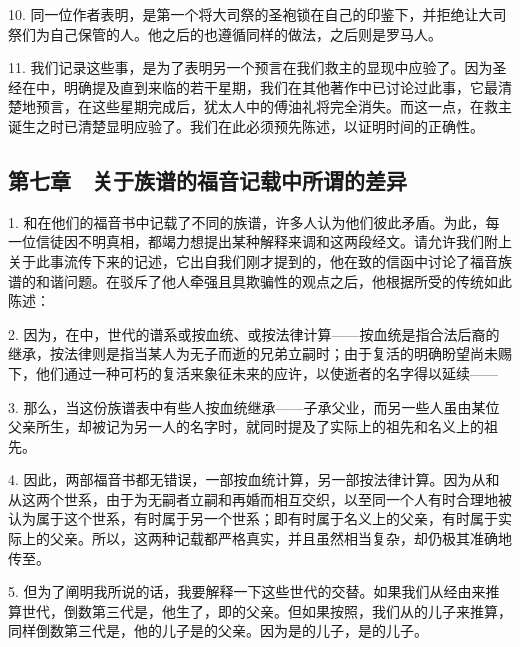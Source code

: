 10. 同一位作者表明，是第一个将大司祭的圣袍锁在自己的印鉴下，并拒绝让大司祭们为自己保管的人。他之后的也遵循同样的做法，之后则是罗马人。\par

11. 我们记录这些事，是为了表明另一个预言在我们救主的显现中应验了。因为圣经在中，明确提及直到来临的若干星期，我们在其他著作中已讨论过此事，它最清楚地预言，在这些星期完成后，犹太人中的傅油礼将完全消失。而这一点，在救主诞生之时已清楚显明应验了。我们在此必须预先陈述，以证明时间的正确性。\par


\subsection{第七章　关于族谱的福音记载中所谓的差异}

1. 和在他们的福音书中记载了不同的族谱，许多人认为他们彼此矛盾。为此，每一位信徒因不明真相，都竭力想提出某种解释来调和这两段经文。请允许我们附上关于此事流传下来的记述，它出自我们刚才提到的，他在致的信函中讨论了福音族谱的和谐问题。在驳斥了他人牵强且具欺骗性的观点之后，他根据所受的传统如此陈述：\par

2. 因为，在中，世代的谱系或按血统、或按法律计算——按血统是指合法后裔的继承，按法律则是指当某人为无子而逝的兄弟立嗣时；由于复活的明确盼望尚未赐下，他们通过一种可朽的复活来象征未来的应许，以使逝者的名字得以延续——\par

3. 那么，当这份族谱表中有些人按血统继承——子承父业，而另一些人虽由某位父亲所生，却被记为另一人的名字时，就同时提及了实际上的祖先和名义上的祖先。\par

4. 因此，两部福音书都无错误，一部按血统计算，另一部按法律计算。因为从和从这两个世系，由于为无嗣者立嗣和再婚而相互交织，以至同一个人有时合理地被认为属于这个世系，有时属于另一个世系；即有时属于名义上的父亲，有时属于实际上的父亲。所以，这两种记载都严格真实，并且虽然相当复杂，却仍极其准确地传至。\par

5. 但为了阐明我所说的话，我要解释一下这些世代的交替。如果我们从经由来推算世代，倒数第三代是，他生了，即的父亲。但如果按照，我们从的儿子来推算，同样倒数第三代是，他的儿子是的父亲。因为是的儿子，是的儿子。\par

